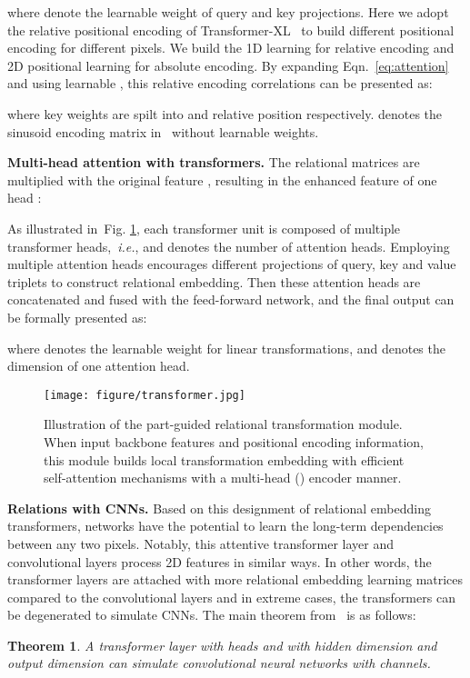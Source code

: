 \documentclass[journal]{IEEEtran}
\def\ie{{\em i.e.}}
\newcommand{\figref}[1]{Fig. \ref{#1}}
\begin{document}
where  denote the learnable weight of query and key projections. Here we adopt the relative positional encoding of Transformer-XL~\cite{dai2019transformer} to build different positional encoding for different pixels. We build the 1D learning for relative encoding and 2D positional learning for absolute encoding.  By expanding Eqn.~\eqref{eq:attention} and using learnable , this relative encoding correlations  can be presented as:

where key weights are spilt into  and relative position  respectively.  denotes the sinusoid encoding matrix in~\cite{vaswani2017attention} without learnable weights.

\textbf{Multi-head attention with transformers.}
The relational matrices  are multiplied with the original feature , resulting in the enhanced feature of one head :

As illustrated in~\figref{fig:transformer}, each transformer unit is composed of multiple transformer heads,~\ie,  and  denotes the number of attention heads. Employing multiple attention heads encourages different projections of query, key and value triplets to construct relational embedding. Then these attention heads are concatenated and fused with the feed-forward network, and the final output  can be formally presented as:

where  denotes the learnable weight for linear transformations, and  denotes the dimension of one attention head.


\begin{figure}[!t]
	\centering
	\texttt{[image: figure/transformer.jpg]}
	\caption{Illustration of the part-guided relational transformation module. When input backbone features and positional encoding information, this module builds local transformation embedding with efficient self-attention mechanisms with a multi-head () encoder manner.
	}
	\label{fig:transformer}
\end{figure}

\textbf{Relations with CNNs.}
Based on this designment of relational embedding transformers, networks have the potential to learn the long-term dependencies between any two pixels. Notably, this attentive transformer layer and convolutional layers process 2D features in similar ways. In other words, the transformer layers are attached with more relational embedding learning matrices compared to the convolutional layers and in extreme cases, the transformers can be degenerated to simulate CNNs. The main theorem from~\cite{cordonnier2020relationship} is as follows:
\newtheorem{thm}{\bf Theorem}[section]
\begin{thm}\label{thm1}
A transformer layer with  heads and with hidden dimension  and output dimension  can simulate convolutional neural networks with  channels.
\end{thm}
\end{document}
